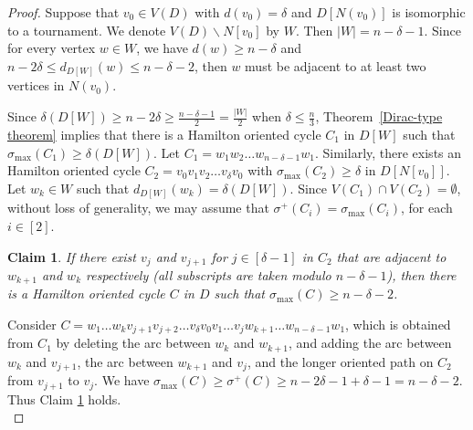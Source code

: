 \documentclass[11pt]{article}
\newtheorem{claim}{Claim}
\newcommand{\2}{\vspace{0.2cm}}
\begin{document}
  \begin{proof}Suppose that $v_0 \in V(D)$ with $d(v_0) = \delta$ and $D[N(v_0)]$ is isomorphic to a tournament. We denote $V(D)\backslash N[v_0]$ by $W$. Then $|W|=n-\delta-1$. Since for every vertex $w \in W$, we have $d(w) \ge n-\delta$ and $n-2\delta \le d_{D[W]}(w) \le n-\delta-2$, then $w$ must be adjacent to at least two vertices in $N(v_0)$.

  Since  $\delta(D[W]) \ge n-2\delta \ge \frac{n-\delta-1}{2}= \frac{|W|}{2}$ when $\delta \le \frac{n}{3}$, Theorem~\ref{Dirac-type theorem} implies that there is a Hamilton oriented cycle $C_1$ in $D[W]$ such that $\sigma_{\max}(C_1)\ge \delta(D[W])$. Let $C_1=w_1w_2 \ldots w_{n-\delta-1}w_1$. Similarly, there exists an Hamilton oriented cycle $C_2 = v_0 v_1 v_2\ldots v_{\delta}v_0$ with $\sigma_{\max}(C_2) \ge \delta$  in $D[N[v_0]]$. %
  Let $w_k \in W$ such that $d_{D[W]}(w_k) = \delta(D[W])$. %
  Since $V(C_1)\cap V(C_2)=\emptyset$, without loss of generality, we may assume that $\sigma^+(C_i) = \sigma_{\max}(C_i)$, for each $i \in [2]$.

\begin{claim}\label{claim:2.2-1}
     If there exist $v_{j}$ and $v_{j+1}$ for $j\in [\delta-1]$ in $C_2$ that are adjacent to $w_{k+1}$ and $w_{k}$ respectively (all subscripts are taken modulo $n-\delta-1$), then there is a Hamilton oriented cycle $C$ in $D$ such that $\sigma_{\max}(C) \ge n-\delta-2$.
\end{claim}
 Consider $C = w_1\ldots w_k v_{j+1}v_{j+2} \ldots v_{\delta} v_0 v_1\dots v_{j} w_{k+1} \ldots w_{n-\delta-1}w_1$, which is obtained from $C_1$ by deleting the arc between $w_k$ and $w_{k+1}$, and adding the arc between $w_k$ and $v_{j+1}$, the arc between $w_{k+1}$ and $v_{j}$, and the longer oriented path on $C_2$ from $v_{j+1}$ to $v_{j}$. We have $\sigma_{\max}(C) \ge \sigma^+(C)\ge n-2\delta - 1 + \delta -1=n-\delta -2$. Thus Claim \ref{claim:2.2-1} holds.\\


\end{proof}
\end{document}
